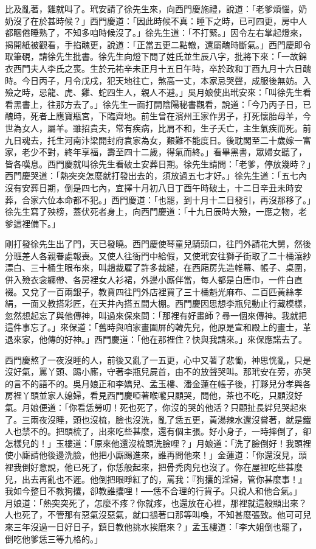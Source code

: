 比及亂著，雞就叫了。玳安請了徐先生來，向西門慶施禮，說道：「老爹煩惱，奶奶沒了在於甚時候？」西門慶道：「因此時候不真：睡下之時，已可四更，房中人都睏倦睡熟了，不知多咱時候沒了。」徐先生道：「不打緊。」因令左右掌起燈來，揭開紙被觀看，手掐醜更，說道：「正當五更二點轍，還屬醜時斷氣。」西門慶即令取筆硯，請徐先生批書。徐先生向燈下問了姓氏並生辰八字，批將下來：「一故錦衣西門夫人李氏之喪。生於元祐辛未正月十五日午時，卒於政和丁酉九月十六日醜時。今日丙子，月令戊戌，犯天地往亡，煞高一丈，本家忌哭聲，成服後無妨。入殮之時，忌龍、虎、雞、蛇四生人，親人不避。」吳月娘使出玳安來：「叫徐先生看看黑書上，往那方去了。」徐先生一面打開陰陽秘書觀看，說道：「今乃丙子日，已醜時，死者上應寶瓶宮，下臨齊地。前生曾在濱州王家作男子，打死懷胎母羊，今世為女人，屬羊。雖招貴夫，常有疾病，比肩不和，生子夭亡，主生氣疾而死。前九日魂去，托生河南汴梁開封府袁家為女，艱難不能度日。後耽閣至二十歲嫁一富家，老少不對，終年享福，壽至四十二歲，得氣而終。」看畢黑書，眾婦女聽了，皆各嘆息。西門慶就叫徐先生看破土安葬日期。徐先生請問：「老爹，停放幾時？」西門慶哭道：「熱突突怎麼就打發出去的，須放過五七才好。」徐先生道：「五七內沒有安葬日期，倒是四七內，宜擇十月初八日丁酉午時破土，十二日辛丑未時安葬，合家六位本命都不犯。」西門慶道：「也罷，到十月十二日發引，再沒那移了。」徐先生寫了殃榜，蓋伏死者身上，向西門慶道：「十九日辰時大殮，一應之物，老爹這裡備下。」

剛打發徐先生出了門，天已發曉。西門慶使琴童兒騎頭口，往門外請花大舅，然後分班差人各親眷處報喪。又使人往衙門中給假，又使玳安往獅子街取了二十桶瀼紗漂白、三十桶生眼布來，叫趙裁雇了許多裁縫，在西廂房先造帷幕、帳子、桌圍，併入殮衣衾纏帶、各房裡女人衫裙，外邊小廝伴當，每人都是白唐巾，一件白直裰。又兌了一百兩銀子，教賁四往門外店裡買了三十桶魁光麻布、二百匹黃絲孝絹，一面又教搭彩匠，在天井內搭五間大棚。西門慶因思想李瓶兒動止行藏模樣，忽然想起忘了與他傳神，叫過來保來問：「那裡有好畫師？尋一個來傳神。我就把這件事忘了。」來保道：「舊時與咱家畫圍屏的韓先兒，他原是宣和殿上的畫士，革退來家，他傳的好神。」西門慶道：「他在那裡住？快與我請來。」來保應諾去了。

西門慶熬了一夜沒睡的人，前後又亂了一五更，心中又著了悲慟，神思恍亂，只是沒好氣，罵丫頭、踢小廝，守著李瓶兒屍首，由不的放聲哭叫。那玳安在旁，亦哭的言不的語不的。吳月娘正和李嬌兒、孟玉樓、潘金蓮在帳子後，打夥兒分孝與各房裡丫頭並家人媳婦，看見西門慶啞著喉嚨只顧哭，問他，茶也不吃，只顧沒好氣。月娘便道：「你看恁勞叨！死也死了，你沒的哭的他活？只顧扯長絆兒哭起來了。三兩夜沒睡，頭也沒梳，臉也沒洗，亂了恁五更，黃湯辣水還沒嘗著，就是鐵人也禁不的。把頭梳了，出來吃些甚麼，還有個主張。好小身子，一時摔倒了，卻怎樣兒的！」玉樓道：「原來他還沒梳頭洗臉哩？」月娘道：「洗了臉倒好！我頭裡使小廝請他後邊洗臉，他把小廝踢進來，誰再問他來！」金蓮道：「你還沒見，頭裡我倒好意說，他已死了，你恁般起來，把骨禿肉兒也沒了。你在屋裡吃些甚麼兒，出去再亂也不遲。他倒把眼睜紅了的，罵我：『狗攮的淫婦，管你甚麼事！』我如今整日不教狗攮，卻教誰攮哩！──恁不合理的行貨子。只說人和他合氣。」 月娘道：「熱突突死了，怎麼不疼？你就疼，也還放在心裡，那裡就這般顯出來？人也死了，不管那有惡氣沒惡氣，就口撾著口那等叫喚，不知甚麼張致。他可可兒來三年沒過一日好日子，鎮日教他挑水挨磨來？」孟玉樓道：「李大姐倒也罷了，倒吃他爹恁三等九格的。」

